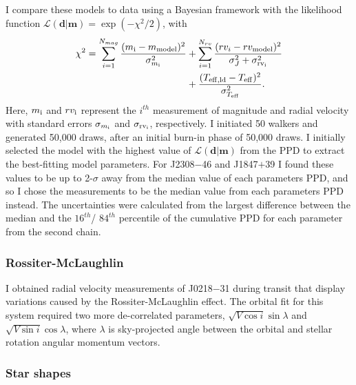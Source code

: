 I compare these models to data using a Bayesian framework with the likelihood function $\mathcal{L}(\textbf{d}|\textbf{m}) = \exp (-\chi^2/2)$, with
%
\begin{equation}\label{chi_squared}
\begin{split}
\chi^{2} = \sum_{i=1}^{N_{mag}} \frac{(m_{\rm i} - m_{\rm model})^2}{ \sigma_{m_{\rm i}}^2} &+ \sum_{i=1}^{N_{rv}} \frac{(rv_i - rv_{\rm model})^2}{\sigma_J^2 +  \sigma_{\rm rv_i}^2} \\ &+  \frac{(T_{\rm eff,ld} - T_{\rm eff})^2}{\sigma_{T_{\rm eff}}^2} .
\end{split}
\end{equation}
%
Here,  $m_{\rm i}$ and $rv_{\rm i}$ represent the $i^{th}$ measurement of magnitude and radial velocity with standard errors $\sigma_{m_{\rm i}}$ and $\sigma_{\rm rv_i}$,  respectively. I initiated 50 walkers and generated 50,000 draws, after an initial burn-in phase of 50,000 draws. I initially selected the model with the highest value of $\mathcal{L}(\textbf{d}|\textbf{m})$ from the PPD to extract the best-fitting model parameters. For J2308$-$46 and J1847$+$39 I found these values to be up to 2-$\sigma$ away from the median value of each parameters PPD, and so I chose the measurements to be the median value from each parameters PPD instead. The uncertainties were calculated from the largest difference between the median and the $16^{th}$/ $84^{th}$ percentile of the cumulative PPD for each parameter from the second chain.


\subsubsection{Rossiter-McLaughlin}

I obtained radial velocity measurements of J0218$-$31 during transit that display variations caused by the Rossiter-McLaughlin effect. The orbital fit for this system required two more de-correlated parameters,  $\sqrt{V \cos i} \sin \lambda$ and $\sqrt{V \sin i} \cos \lambda$, where $\lambda$ is sky-projected angle between the orbital and stellar rotation angular momentum vectors.

\subsubsection{Star shapes}

